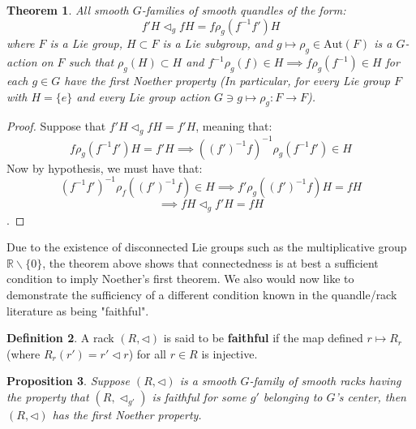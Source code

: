 \documentclass[12pt]{amsart}
\theoremstyle{plain}
\newtheorem{theorem}{Theorem}[section]
\newtheorem{proposition}[theorem]{Proposition}
\theoremstyle{definition}
\newtheorem{definition}[theorem]{Definition}
\begin{document}
\vspace{5mm}

   
 
  
   \begin{theorem}
       
   All smooth $G$-families of smooth quandles of the form:
   $$ f'H\triangleleft_{g} fH = f\rho_{g}(f^{-1}f')H  $$
   where $F$ is a Lie group, $H \subset F$ is a Lie subgroup, and $g \mapsto \rho_g \in \text{Aut}(F)$ is a $G$-action on $F$ such that $\rho_g(H) \subset H$ and $f^{-1}\rho_{g} (f) \in H \implies f \rho_{g}(f^{-1}) \in H$ for each $g \in G$ have the first Noether property (In particular, for every Lie group $F$ with $H=\{e\}$ and every Lie group action $ G \ni g \mapsto \rho_g:F \to F $).  
   \end{theorem}

   
\begin{proof}
    Suppose that $f'H\triangleleft_{g} fH = f'H$, meaning that:
$$ f\rho_{g}(f^{-1}f') H = f'H   \implies  ((f')^{-1}f)^{-1}\rho_{g}( f^{-1}f' )  \in  H  $$
Now by hypothesis, we must have that:
$$   ( f^{-1}f')^{-1}\rho_{f}( (f')^{-1}f )  \in  H   \implies  f'\rho_{g}((f')^{-1}f)H = fH  $$
$$ \implies  fH\triangleleft_{g} f'H = fH$$.
\end{proof} 

\vspace{5mm}
   
Due to the existence of disconnected Lie groups such as the multiplicative group $\mathbb{R}\backslash\{0\}$, the theorem above shows that connectedness is at best a sufficient condition to imply Noether's first theorem. We also would now like to demonstrate the sufficiency of a different condition known in the quandle/rack literature as being "faithful".

\vspace{5mm}


\begin{definition}
    
A rack $(R,\triangleleft)$ is said to be \textbf{faithful} if the map defined $ r \mapsto R_r $ (where $R_r(r') = r' \triangleleft r$) for all $r \in R$ is injective.
\end{definition}

\vspace{5mm}


\begin{proposition}
Suppose $(R,\triangleleft)$ is a smooth $G$-family of smooth racks having the property that $(R,\triangleleft_{g'})  $ is faithful for some $g' $ belonging to $G$'s center, then $(R,\triangleleft)$ has the first Noether property.
\end{proposition}
\end{document}
